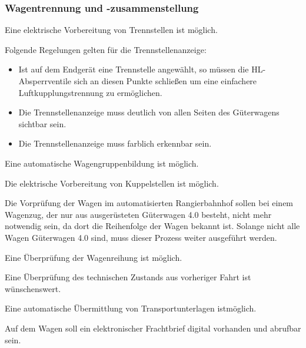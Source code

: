 \subsubsection{Wagentrennung und -zusammenstellung}
\begin{feat}
Eine elektrische Vorbereitung von Trennstellen ist möglich.
\end{feat}
\begin{rem} [zu Anf. 49]
Folgende Regelungen gelten für die Trennstellenanzeige:
\begin{itemize}
    \item Ist auf dem Endgerät eine Trennstelle angewählt, so müssen die \acrshort{HL}-Absperrventile sich an diesen Punkte schließen um eine einfachere Luftkupplungstrennung zu ermöglichen.
    \item Die Trennstellenanzeige muss deutlich von allen Seiten des Güterwagens sichtbar sein.
    \item Die Trennstellenanzeige muss farblich erkennbar sein.
\end{itemize}
\end{rem}
\begin{feat}
Eine automatische Wagengruppenbildung ist möglich.
\end{feat}
\begin{feat}
Die elektrische Vorbereitung von Kuppelstellen ist möglich.
\end{feat}
Die Vorprüfung der Wagen im automatisierten Rangierbahnhof sollen bei einem Wagenzug, der nur aus ausgerüsteten Güterwagen 4.0 besteht, nicht mehr notwendig sein, da dort die Reihenfolge der Wagen bekannt ist. Solange nicht alle Wagen Güterwagen 4.0 sind, muss dieser Prozess weiter ausgeführt werden.
\begin{feat}
Eine Überprüfung der Wagenreihung ist möglich.
\end{feat}
\begin{feat}
Eine Überprüfung des technischen Zustands aus vorheriger Fahrt ist wünschenswert.
\end{feat}
\begin{feat}
Eine automatische Übermittlung von Transportunterlagen ist\newline möglich.
\end{feat}
\begin{feat}
Auf dem Wagen soll ein elektronischer Frachtbrief digital vorhanden und abrufbar sein.
\end{feat}

